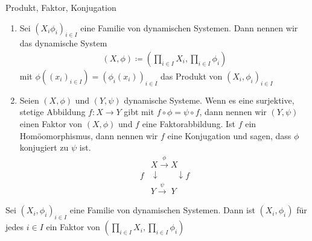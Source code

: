 \begin{definition} Produkt, Faktor, Konjugation
  
  \renewcommand{\labelenumi}{(\alph{enumi})}
  
  \begin{enumerate}
  \item Sei $(X_i \phi_i)_{i \in I}$ eine Familie von dynamischen Systemen. Dann nennen wir das dynamische System
    \begin{align*}
      (X, \phi) \coloneqq (\prod_{i \in I} X_i, \prod_{i \in I}\phi_i)
    \end{align*}
    mit $\phi \left( (x_i)_{i \in I}\right) =  \left( \phi_i (x_i)\right)_{i \in I}$ das Produkt von $(X_i, \phi_i)_{i \in I}$
  \item Seien $(X, \phi)$ und $(Y, \psi)$ dynamische Systeme. Wenn es eine surjektive, stetige Abbildung $f:X \to Y$ gibt mit $f \circ \phi = \psi \circ f$, dann nennen wir $(Y, \psi)$ einen Faktor von $(X, \phi)$ und $f$ eine Faktorabbildung. Ist $f$ ein Homöomorphismus, dann nennen wir $f$ eine Konjugation und sagen, dass $\phi$ konjugiert zu $\psi$ ist.
    \begin{align*}
      &X \overset{\phi}{\to} X\\
      f&\downarrow \qquad \downarrow f\\
      &Y \overset{\psi}{\to}  \; Y 
    \end{align*}
  \end{enumerate}
\end{definition}

\begin{uebung}
  Sei $(X_i,\phi_i)_{i \in I}$ eine Familie von dynamischen Systemen. Dann ist $(X_i, \phi_i)$ für jedes $i \in I$ ein Faktor von $(\prod_{i\in I} X_i, \prod_{i\in I} \phi_i)$
\end{uebung}

